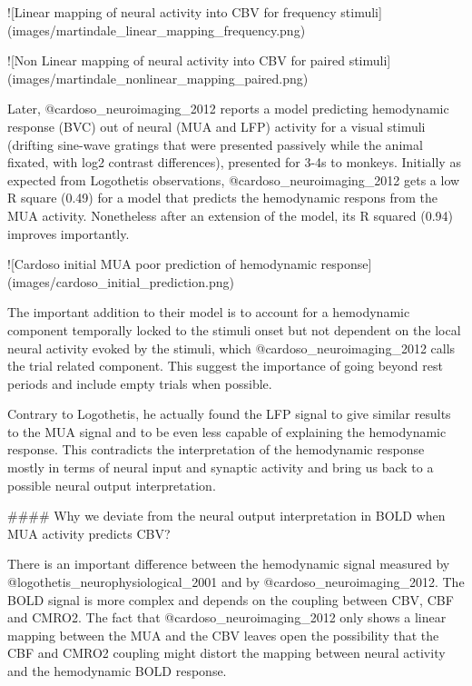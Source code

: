 ![Linear mapping of neural activity into CBV for frequency stimuli](images/martindale_linear_mapping_frequency.png)

![Non Linear mapping of neural activity into CBV for paired stimuli](images/martindale_nonlinear_mapping_paired.png)

Later, @cardoso_neuroimaging_2012 reports a model predicting hemodynamic response (BVC) out of neural (MUA and LFP) activity for a visual stimuli (drifting sine-wave gratings that were presented passively while the animal fixated, with log2 contrast differences), presented for 3-4s to monkeys. Initially as expected from Logothetis observations, @cardoso_neuroimaging_2012 gets a low R square (0.49) for a model that predicts the hemodynamic respons from the MUA activity. Nonetheless after an extension of the model, its R squared (0.94) improves importantly.

![Cardoso initial MUA poor prediction of hemodynamic response](images/cardoso_initial_prediction.png)

The important addition to their model is to account for a hemodynamic component temporally locked to the stimuli onset but not dependent on the local neural activity evoked by the stimuli, which @cardoso_neuroimaging_2012 calls the trial related component. This suggest the importance of going beyond rest periods and include empty trials when possible.

Contrary to Logothetis, he actually found the LFP signal to give similar results to the MUA signal and to be even less capable of explaining the hemodynamic response. This contradicts the interpretation of the hemodynamic response mostly in terms of neural input and synaptic activity and bring us back to a possible neural output interpretation.

#### Why we deviate from the neural output interpretation in BOLD when MUA activity predicts CBV?

There is an important difference between the hemodynamic signal measured by @logothetis_neurophysiological_2001 and by @cardoso_neuroimaging_2012. The BOLD signal is more complex and depends on the coupling between CBV, CBF and CMRO2. The fact that @cardoso_neuroimaging_2012 only shows a linear mapping between the MUA and the CBV leaves open the possibility that the CBF and CMRO2 coupling might distort the mapping between neural activity and the hemodynamic BOLD response.


